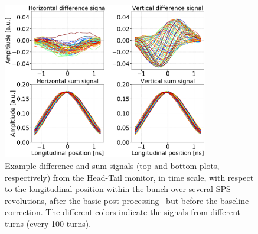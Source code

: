 \begin{figure}[!h]
   \centering         
   \includegraphics[width=0.8\textwidth]{images/Ch4/HT_1D__20180530_135105exampleAcq_4thesis_turnsStart0_Stop6000_step100_new.png}
       \caption{Example difference and sum signals (top and bottom plots, respectively) from the Head-Tail monitor, in time scale, with respect to the longitudinal position within the bunch over several SPS revolutions, after the basic post processing~\cite{Levens:2313358} but before the baseline correction. The different colors indicate the signals from different turns (every 100 turns). } %
       \label{fig:HT_example_signals}
\end{figure}


